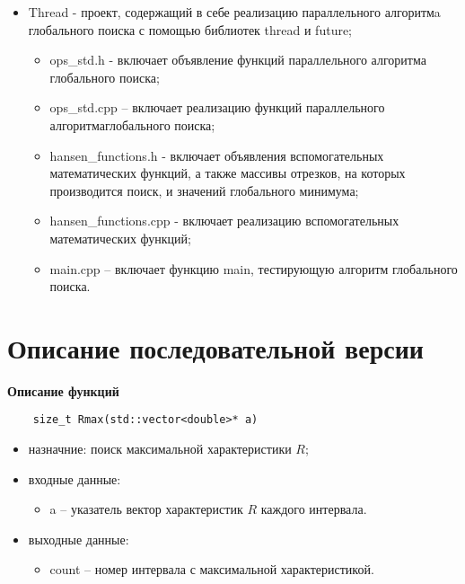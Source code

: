 \documentclass{report}
\begin{document}
\begin{itemize}
    \item Thread - проект, содержащий в себе реализацию параллельного алгоритмa глобального поиска с помощью библиотек thread и future;
        \begin{itemize}
            \item ops\_std.h - включает объявление функций параллельного алгоритма глобального поиска;
            \item ops\_std.cpp – включает реализацию функций параллельного алгоритмаглобального поиска;
            \item hansen\_functions.h - включает объявления вспомогательных математических функций, а также массивы отрезков, на которых производится поиск, и значений глобального минимума;
            \item hansen\_functions.cpp - включает реализацию вспомогательных математических функций;
            \item main.cpp – включает функцию main, тестирующую алгоритм глобального поиска.
        \end{itemize}
\end{itemize}

\section{Описание последовательной версии}

\textbf{Описание функций}
\begin{lstlisting}
    size_t Rmax(std::vector<double>* a) 
\end{lstlisting}

\begin{itemize}
    \item назначние: поиск максимальной характеристики $R$;
    \item входные данные:
        \begin{itemize}	
            \item a – указатель вектор характеристик $R$ каждого интервала.
        \end{itemize}
    \item выходные данные:
        \begin{itemize}
        	\item count – номер интервала с максимальной характеристикой.
        \end{itemize}
\end{itemize}
\end{document}
